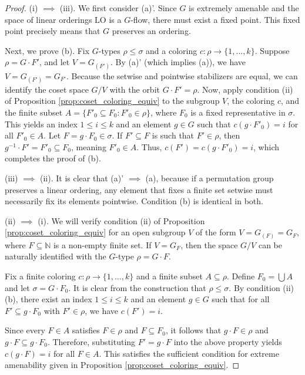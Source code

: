 \begin{proof}
    (i) $\implies$ (iii). We first consider (a)'. Since $G$ is extremely amenable and the space of linear orderings $\mathrm{LO}$ is a $G$-flow, there must exist a fixed point. This fixed point precisely means that $G$ preserves an ordering.

    Next, we prove (b). Fix $G$-types $\rho \le \sigma$ and a coloring $c: \rho \to \{1, \dots, k\}$. Suppose $\rho = G \cdot F'$, and let $V = G_{(F')}$. By (a)' (which implies (a)), we have $V = G_{(F')} = G_{F'}$. Because the setwise and pointwise stabilizers are equal, we can identify the coset space $G/V$ with the orbit $G \cdot F' = \rho$.
    Now, apply condition (ii) of Proposition \ref{prop:coset_coloring_equiv} to the subgroup $V$, the coloring $c$, and the finite subset $A = \{F'_0 \subseteq F_0 : F'_0 \in \rho\}$, where $F_0$ is a fixed representative in $\sigma$. This yields an index $1 \le i \le k$ and an element $g \in G$ such that $c(g \cdot F'_0) = i$ for all $F'_0 \in A$.
    Let $F = g \cdot F_0 \in \sigma$. If $F' \subseteq F$ is such that $F' \in \rho$, then $g^{-1} \cdot F' = F'_0 \subseteq F_0$, meaning $F'_0 \in A$. Thus, $c(F') = c(g \cdot F'_0) = i$, which completes the proof of (b).

    (iii) $\implies$ (ii). It is clear that (a)' $\implies$ (a), because if a permutation group preserves a linear ordering, any element that fixes a finite set setwise must necessarily fix its elements pointwise. Condition (b) is identical in both.

    (ii) $\implies$ (i). We will verify condition (ii) of Proposition \ref{prop:coset_coloring_equiv} for an open subgroup $V$ of the form $V = G_{(F)} = G_F$, where $F \subseteq \mathbb{N}$ is a non-empty finite set. If $V = G_F$, then the space $G/V$ can be naturally identified with the $G$-type $\rho = G \cdot F$.

    Fix a finite coloring $c: \rho \to \{1, \dots, k\}$ and a finite subset $A \subseteq \rho$. Define $F_0 = \bigcup A$ and let $\sigma = G \cdot F_0$. It is clear from the construction that $\rho \le \sigma$.
    By condition (ii)(b), there exist an index $1 \le i \le k$ and an element $g \in G$ such that for all $F' \subseteq g \cdot F_0$ with $F' \in \rho$, we have $c(F') = i$.

    Since every $F \in A$ satisfies $F \in \rho$ and $F \subseteq F_0$, it follows that $g \cdot F \in \rho$ and $g \cdot F \subseteq g \cdot F_0$. Therefore, substituting $F' = g \cdot F$ into the above property yields $c(g \cdot F) = i$ for all $F \in A$. This satisfies the sufficient condition for extreme amenability given in Proposition \ref{prop:coset_coloring_equiv}.
\end{proof}



